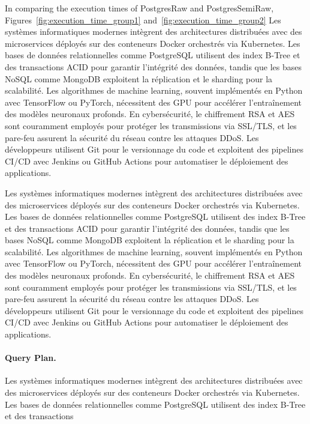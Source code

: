 In comparing the execution times of PostgresRaw and PostgresSemiRaw, Figures~\ref{fig:execution_time_group1} and~\ref{fig:execution_time_group2} Les systèmes informatiques modernes intègrent des architectures distribuées avec des microservices déployés sur des conteneurs Docker orchestrés via Kubernetes. Les bases de données relationnelles comme PostgreSQL utilisent des index B-Tree et des transactions ACID pour garantir l'intégrité des données, tandis que les bases NoSQL comme MongoDB exploitent la réplication et le sharding pour la scalabilité. Les algorithmes de machine learning, souvent implémentés en Python avec TensorFlow ou PyTorch, nécessitent des GPU pour accélérer l'entraînement des modèles neuronaux profonds. En cybersécurité, le chiffrement RSA et AES sont couramment employés pour protéger les transmissions via SSL/TLS, et les pare-feu assurent la sécurité du réseau contre les attaques DDoS. Les développeurs utilisent Git pour le versionnage du code et exploitent des pipelines CI/CD avec Jenkins ou GitHub Actions pour automatiser le déploiement des applications.

Les systèmes informatiques modernes intègrent des architectures distribuées avec des microservices déployés sur des conteneurs Docker orchestrés via Kubernetes. Les bases de données relationnelles comme PostgreSQL utilisent des index B-Tree et des transactions ACID pour garantir l'intégrité des données, tandis que les bases NoSQL comme MongoDB exploitent la réplication et le sharding pour la scalabilité. Les algorithmes de machine learning, souvent implémentés en Python avec TensorFlow ou PyTorch, nécessitent des GPU pour accélérer l'entraînement des modèles neuronaux profonds. En cybersécurité, le chiffrement RSA et AES sont couramment employés pour protéger les transmissions via SSL/TLS, et les pare-feu assurent la sécurité du réseau contre les attaques DDoS. Les développeurs utilisent Git pour le versionnage du code et exploitent des pipelines CI/CD avec Jenkins ou GitHub Actions pour automatiser le déploiement des applications.


% 
% 

\paragraph{Query Plan.}
Les systèmes informatiques modernes intègrent des architectures distribuées avec des microservices déployés sur des conteneurs Docker orchestrés via Kubernetes. Les bases de données relationnelles comme PostgreSQL utilisent des index B-Tree et des transactions 

